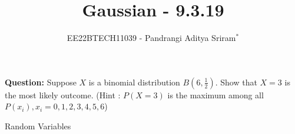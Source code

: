 \documentclass[journal,12pt,twocolumn]{IEEEtran}
\theoremstyle{remark}
\begin{document}

\vspace{3cm}

\title{Gaussian - 9.3.19}
\author{EE22BTECH11039 - Pandrangi Aditya Sriram$^{*}$%
}
\maketitle
\newpage
\bigskip

\renewcommand{\thefigure}{\theenumi}
\renewcommand{\thetable}{\theenumi}


\vspace{3cm}
\textbf{Question:} Suppose $X$ is a binomial distribution $B\left(6,\frac{1}{2}\right)$. Show that $X=3$ is the most likely outcome.
(Hint : $P(X=3)$ is the maximum among all $P(x_i),x_i=0,1,2,3,4,5,6$)\\
\solution
\fi
\begin{table}[h]
    
    \label{tab:9.3.19_table}
    \caption{Random Variables}
\end{table}
\end{document}
